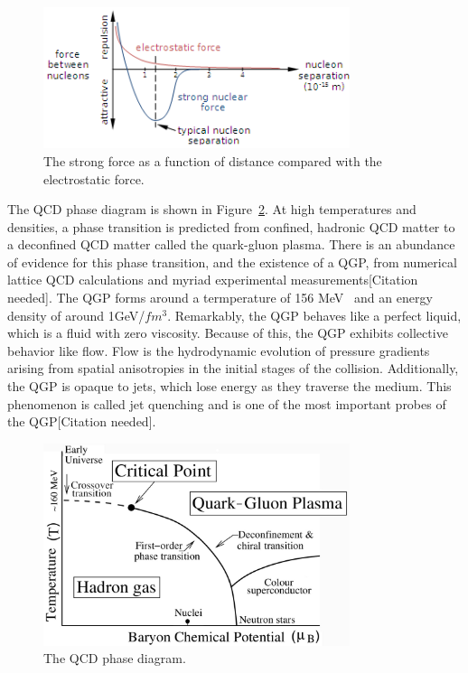 \begin{figure}
    \centering
    \includegraphics[width=0.8\textwidth]{figures/png/strong_force.png}
    \caption{The strong force as a function of distance compared with the electrostatic force.}\label{fig:strong_force}
\end{figure}

The QCD phase diagram is shown in Figure~\ref{fig:phase_diagram}. At high temperatures and densities, a phase transition is predicted from confined, hadronic QCD matter to a deconfined QCD matter called the quark-gluon plasma. There is an abundance of evidence for this phase transition, and the existence of a QGP, from numerical lattice QCD calculations and myriad experimental measurements[Citation needed]. The QGP forms around a termperature of 156 MeV~\cite{QCDTemp} and an energy density of around 1GeV/$fm^3$. Remarkably, the QGP behaves like a perfect liquid, which is a fluid with zero viscosity. Because of this, the QGP exhibits collective behavior like flow. Flow is the hydrodynamic evolution of pressure gradients arising from spatial anisotropies in the initial stages of the collision. Additionally, the QGP is opaque to jets, which lose energy as they traverse the medium. This phenomenon is called jet quenching and is one of the most important probes of the QGP[Citation needed]. 

\begin{figure}
    \centering
    \includegraphics[width=0.8\textwidth]{figures/png/phase_diagram.jpg}
    \caption{The QCD phase diagram.}\label{fig:phase_diagram}
\end{figure}

